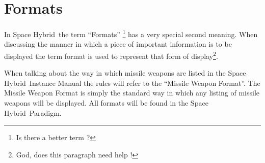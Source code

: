 \section{Formats}

In Space Hybrid\ the term ``Formats'' \footnote{Is there a better term ? }
has a very special second meaning. When discussing the manner in 
which a piece of important information is to be displayed the term 
format is used to represent that form of display\footnote{God, does 
this paragraph need help !}. 

When talking about the way in which missile weapons are listed in the 
Space Hybrid\ Instance Manual the rules will refer to the 
``Missile Weapon Format''. The Missile Weapon Format is simply the 
standard way in which any listing of missile weapons will be displayed.
All formats will be found in the Space Hybrid\ Paradigm.



